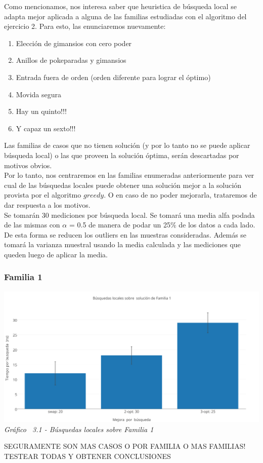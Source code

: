 Como mencionamos, nos interesa saber que heuristica de búsqueda local se adapta mejor aplicada a alguna de las familias estudiadas con el algoritmo del ejercicio 2. Para esto, las enunciaremos nuevamente:

\begin{enumerate}
\item Elección de gimansios con cero poder 
\item Anillos de pokeparadas y gimansios
\item Entrada fuera de orden (orden diferente para lograr el óptimo)
\item Movida segura
\item Hay un quinto!!!
\item Y capaz un sexto!!!
\end{enumerate}

Las familias de casos que no tienen solución (y por lo tanto no se puede aplicar búsqueda local) o las que proveen la solución óptima, serán descartadas por motivos obvios.\\
Por lo tanto, nos centraremos en las familias enumeradas anteriormente para ver cual de las búsquedas locales puede obtener una solución mejor a la solución provista por el algoritmo $greedy$. O en caso de no poder mejorarla, trataremos de dar respuesta a los motivos.\\

Se tomarán 30 mediciones por búsqueda local. Se tomará una media alfa podada de las mismas con $\alpha$ = 0.5 de manera de podar un 25\% de los datos a cada lado. De esta forma se reducen los outliers en las muestras consideradas. 
Además se tomará la varianza muestral usando la media calculada y las mediciones que queden luego de aplicar la media.\\

\subsubsection*{Familia 1}

\vspace*{0.3cm} \vspace*{0.3cm}
  \begin{center}
 \includegraphics[scale=0.5]{./EJ3/local_search_familia.png}
 {            \textit{Gráfico \ 3.1 - Búsquedas locales sobre Familia 1}}
  \end{center}
  \vspace*{0.3cm}
  
SEGURAMENTE SON MAS CASOS O POR FAMILIA O MAS FAMILIAS! TESTEAR TODAS Y OBTENER CONCLUSIONES
